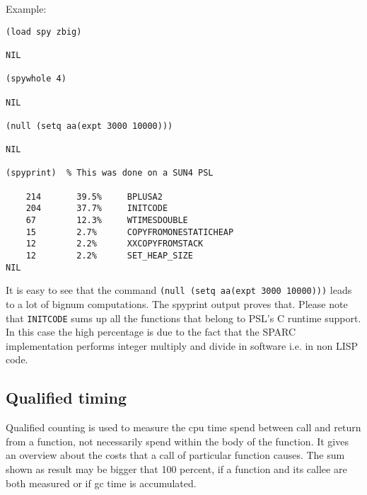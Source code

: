 

Example:
\begin{verbatim}
(load spy zbig)

NIL

(spywhole 4)

NIL

(null (setq aa(expt 3000 10000)))

NIL

(spyprint)  % This was done on a SUN4 PSL

	214       39.5%     BPLUSA2
	204       37.7%     INITCODE
	67        12.3%     WTIMESDOUBLE
	15        2.7%      COPYFROMONESTATICHEAP
	12        2.2%      XXCOPYFROMSTACK
	12        2.2%      SET_HEAP_SIZE
NIL
\end{verbatim}

It is easy to see that the command \verb+(null (setq aa(expt 3000 10000)))+
leads to a lot of bignum computations. The spyprint output proves that.
Please note that \verb+INITCODE+ sums up all the functions that belong
to PSL's C runtime support. In this case the high percentage is due
to the fact that the SPARC implementation performs integer multiply and
divide in software i.e. in non LISP code.

\subsection{Qualified timing}           

Qualified counting is used to measure the cpu time spend between
call and return from a function, not necessarily spend within the 
body of the function. It gives an overview about the costs that
a call of particular function causes. The sum shown as result may
be bigger that 100 percent, if a function and its callee are both
measured or if gc time is accumulated.
\\

